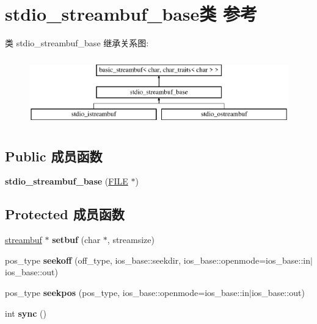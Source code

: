 \hypertarget{classstdio__streambuf__base}{}\section{stdio\+\_\+streambuf\+\_\+base类 参考}
\label{classstdio__streambuf__base}
类 stdio\+\_\+streambuf\+\_\+base 继承关系图\+:\begin{figure}[H]
\begin{center}
\leavevmode
\includegraphics[height=2.989324cm]{classstdio__streambuf__base}
\end{center}
\end{figure}
\subsection*{Public 成员函数}
\begin{DoxyCompactItemize}
\item 
\mbox{\label{classstdio__streambuf__base_a4b43091b8bfe790dc1708a9136667fa8}} 
{\bfseries stdio\+\_\+streambuf\+\_\+base} (\hyperlink{struct__iobuf}{F\+I\+LE} $\ast$)
\end{DoxyCompactItemize}
\subsection*{Protected 成员函数}
\begin{DoxyCompactItemize}
\item 
\mbox{\label{classstdio__streambuf__base_a190d8e5536b9ad46ef223b72e213104d}} 
\hyperlink{classbasic__streambuf}{streambuf} $\ast$ {\bfseries setbuf} (char $\ast$, streamsize)
\item 
\mbox{\label{classstdio__streambuf__base_ac97e70b0f985d551fed8b73bfb2000c1}} 
pos\+\_\+type {\bfseries seekoff} (off\+\_\+type, ios\+\_\+base\+::seekdir, ios\+\_\+base\+::openmode=ios\+\_\+base\+::in$\vert$ios\+\_\+base\+::out)
\item 
\mbox{\label{classstdio__streambuf__base_a498534c8fcfe33188fba088e0277a463}} 
pos\+\_\+type {\bfseries seekpos} (pos\+\_\+type, ios\+\_\+base\+::openmode=ios\+\_\+base\+::in$\vert$ios\+\_\+base\+::out)
\item 
\mbox{\label{classstdio__streambuf__base_a5003e0ccbbe9f2724fc5afe1d26b49c6}} 
int {\bfseries sync} ()
\end{DoxyCompactItemize}
